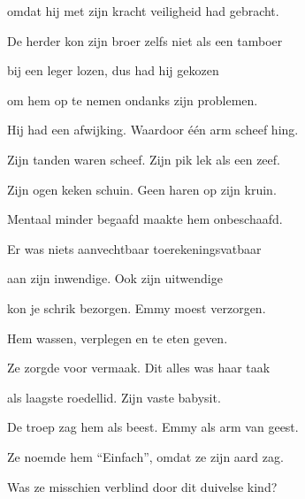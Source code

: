 omdat hij met zijn kracht
veiligheid had gebracht.

De herder kon zijn broer
zelfs niet als een tamboer

bij een leger lozen,
dus had hij gekozen

om hem op te nemen
ondanks zijn problemen.

Hij had een afwijking.
Waardoor één arm scheef hing.

Zijn tanden waren scheef.
Zijn pik lek als een zeef.

Zijn ogen keken schuin.
Geen haren op zijn kruin.

Mentaal minder begaafd
maakte hem onbeschaafd.

Er was niets aanvechtbaar
toerekeningsvatbaar

aan zijn inwendige.
Ook zijn uitwendige

kon je schrik bezorgen.
Emmy moest verzorgen.

Hem wassen, verplegen
en te eten geven.

Ze zorgde voor vermaak.
Dit alles was haar taak

als laagste roedellid.
Zijn vaste babysit.

De troep zag hem als beest.
Emmy als arm van geest.

Ze noemde hem “Einfach”,
omdat ze zijn aard zag.

Was ze misschien verblind
door dit duivelse kind?

